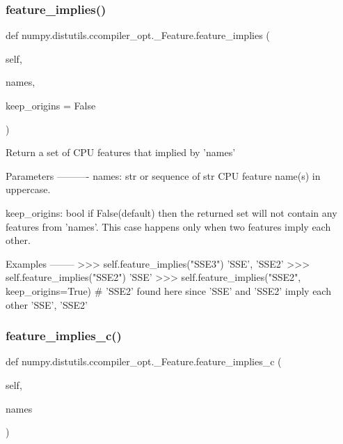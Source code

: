 \subsubsection{\texorpdfstring{feature\+\_\+implies()}{feature\_implies()}}
{\footnotesize\ttfamily def numpy.\+distutils.\+ccompiler\+\_\+opt.\+\_\+\+Feature.\+feature\+\_\+implies (\begin{DoxyParamCaption}\item[{}]{self,  }\item[{}]{names,  }\item[{}]{keep\+\_\+origins = {\ttfamily False} }\end{DoxyParamCaption})}

\begin{DoxyVerb}Return a set of CPU features that implied by 'names'

Parameters
----------
names: str or sequence of str
    CPU feature name(s) in uppercase.

keep_origins: bool
    if False(default) then the returned set will not contain any
    features from 'names'. This case happens only when two features
    imply each other.

Examples
--------
>>> self.feature_implies("SSE3")
{'SSE', 'SSE2'}
>>> self.feature_implies("SSE2")
{'SSE'}
>>> self.feature_implies("SSE2", keep_origins=True)
# 'SSE2' found here since 'SSE' and 'SSE2' imply each other
{'SSE', 'SSE2'}
\end{DoxyVerb}
 \mbox{\label{classnumpy_1_1distutils_1_1ccompiler__opt_1_1__Feature_a4d740c60f856ce7e6950522367c24745}} 
\subsubsection{\texorpdfstring{feature\+\_\+implies\+\_\+c()}{feature\_implies\_c()}}
{\footnotesize\ttfamily def numpy.\+distutils.\+ccompiler\+\_\+opt.\+\_\+\+Feature.\+feature\+\_\+implies\+\_\+c (\begin{DoxyParamCaption}\item[{}]{self,  }\item[{}]{names }\end{DoxyParamCaption})}

